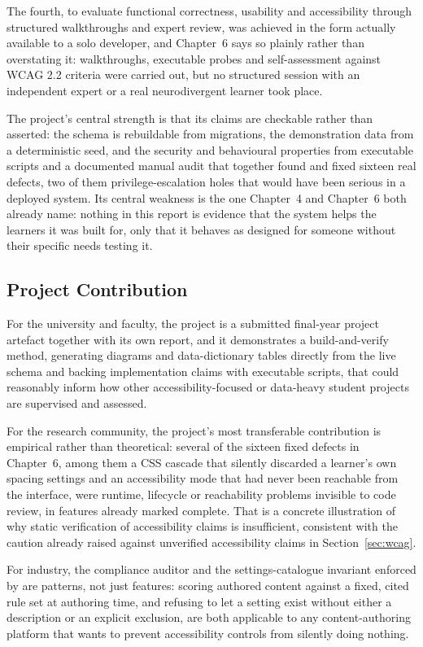 \documentclass[12pt, oneside]{article} %
\newcommand{\tcode}[1]{\path{#1}}
\begin{document}
The fourth, to evaluate functional correctness, usability and accessibility through structured walkthroughs and expert review, was achieved in the form actually available to a solo developer, and Chapter~6 says so plainly rather than overstating it: walkthroughs, executable probes and self-assessment against WCAG 2.2 criteria were carried out, but no structured session with an independent expert or a real neurodivergent learner took place.

The project's central strength is that its claims are checkable rather than asserted: the schema is rebuildable from migrations, the demonstration data from a deterministic seed, and the security and behavioural properties from executable scripts and a documented manual audit that together found and fixed sixteen real defects, two of them privilege-escalation holes that would have been serious in a deployed system. Its central weakness is the one Chapter~4 and Chapter~6 both already name: nothing in this report is evidence that the system helps the learners it was built for, only that it behaves as designed for someone without their specific needs testing it.

\subsection{Project Contribution}

For the university and faculty, the project is a submitted final-year project artefact together with its own report, and it demonstrates a build-and-verify method, generating diagrams and data-dictionary tables directly from the live schema and backing implementation claims with executable scripts, that could reasonably inform how other accessibility-focused or data-heavy student projects are supervised and assessed.

For the research community, the project's most transferable contribution is empirical rather than theoretical: several of the sixteen fixed defects in Chapter~6, among them a CSS cascade that silently discarded a learner's own spacing settings and an accessibility mode that had never been reachable from the interface, were runtime, lifecycle or reachability problems invisible to code review, in features already marked complete. That is a concrete illustration of why static verification of accessibility claims is insufficient, consistent with the caution already raised against unverified accessibility claims in Section~\ref{sec:wcag}.

For industry, the compliance auditor and the settings-catalogue invariant enforced by \tcode{npm run test:a11y-catalog} are patterns, not just features: scoring authored content against a fixed, cited rule set at authoring time, and refusing to let a setting exist without either a description or an explicit exclusion, are both applicable to any content-authoring platform that wants to prevent accessibility controls from silently doing nothing.
\end{document}
